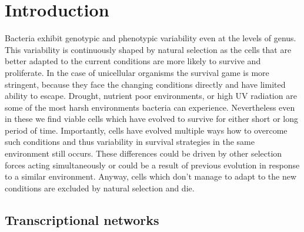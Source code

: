 \chapter{Introduction}
\setcounter{page}{1}

\shorthandoff{-}

Bacteria exhibit genotypic and phenotypic variability even at the levels of genus.
This variability is continuously shaped by natural selection as the cells that are better adapted to the current conditions are more likely to survive and proliferate.
In the case of unicellular organisms the survival game is more stringent, because they face the changing conditions directly and have limited ability to escape.
Drought, nutrient poor environments, or high UV radiation are some of the most harsh environments bacteria can experience.
Nevertheless even in these we find viable cells which have evolved to survive for either short or long period of time.
Importantly, cells have evolved multiple ways how to overcome such conditions and thus variability in survival strategies in the same environment still occurs.
These differences could be driven by other selection forces acting simultaneously or could be a result of previous evolution in response to a similar environment.
Anyway, cells which don't manage to adapt to the new conditions are excluded by natural selection and die.

\section{Transcriptional networks}

